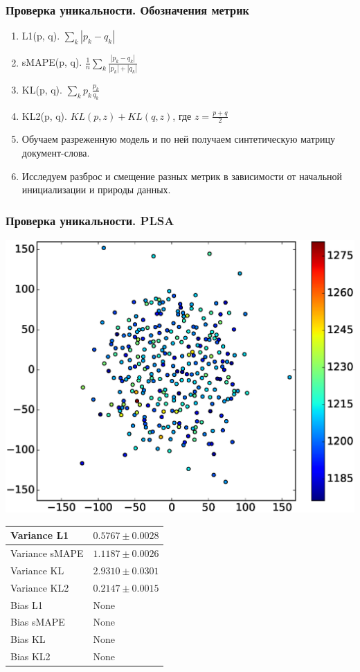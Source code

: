 \documentclass[utf8]{beamer}
\begin{document}
	\begin{frame}	
	\frametitle{Проверка уникальности. Обозначения метрик}
	\begin{enumerate}
\item L1(p, q). $\sum_k |p_k - q_k|$
\item sMAPE(p, q). $\frac1n \sum_k \frac{|p_k - q_k|}{|p_k| + |q_k|}$
\item KL(p, q). $\sum_k p_k \frac{p_k}{q_k}$
\item KL2(p, q). $KL(p, z) + KL(q, z)$, где $z = \frac{p + q}{2}$
\item Обучаем разреженную модель и по ней получаем синтетическую матрицу документ-слова. 
\item Исследуем разброс и смещение разных метрик в зависимости от начальной инициализации и природы данных.
\end{enumerate}
	\end{frame}
	
	\begin{frame}	
	\fontsize{10pt}{9.2}\selectfont
	\frametitle{Проверка уникальности. PLSA}
	 \includegraphics[width=0.45\linewidth]{presentation_pictures/plsa.eps} 
    \begin{tabular}[b]{| l | l | }\hline
      Variance L1 & $0.5767 \pm 0.0028$ \\ \hline
      Variance sMAPE  & $1.1187 \pm  0.0026$ \\ \hline
      Variance KL  & $2.9310 \pm 0.0301$ \\ \hline
      Variance KL2  & $0.2147 \pm 0.0015$ \\ \hline

      Bias L1 & None \\ \hline
      Bias sMAPE  & None \\ \hline
      Bias KL  & None \\ \hline
      Bias KL2  & None \\ \hline
    \end{tabular}

	\end{frame}
	
\end{document}
